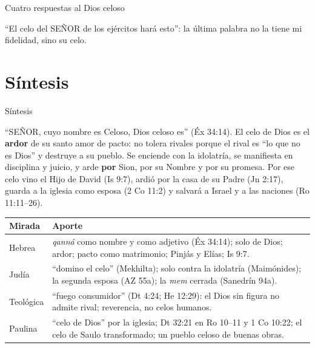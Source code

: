 \documentclass[hyperref={bookmarks=false},aspectratio=169]{beamer}
\newcommand{\SENOR}{S{\fontsize{0.78em}{1em}\selectfont EÑOR}}
\newcommand{\destacar}[1]{\textbf{\textcolor{azul}{#1}}}
\begin{document}
\begin{frame}{Cuatro respuestas al Dios celoso}
\centering
{}\par\medskip
\small\RaggedRight ``El celo del \SENOR{} de los ejércitos hará esto'': la última palabra no la tiene mi fidelidad, sino su celo.
\end{frame}

\section{Síntesis}

\begin{frame}{Síntesis}
\begin{tcolorbox}[colback=papiro,colframe=azul,boxrule=1pt,arc=3pt]
\small ``\SENOR, cuyo nombre es Celoso, Dios celoso es'' (Éx 34:14). El celo de Dios es el \destacar{ardor} de su santo amor de pacto: no tolera rivales porque el rival es ``lo que no es Dios'' y destruye a su pueblo. Se enciende con la idolatría, se manifiesta en disciplina y juicio, y arde \destacar{por} Sion, por su Nombre y por su promesa. Por ese celo vino el Hijo de David (Is 9:7), ardió por la casa de su Padre (Jn 2:17), guarda a la iglesia como esposa (2 Co 11:2) y salvará a Israel y a las naciones (Ro 11:11--26).
\end{tcolorbox}
\scriptsize\renewcommand{\arraystretch}{1.15}
\begin{tabular}{@{}>{\RaggedRight\arraybackslash}p{2.4cm}>{\RaggedRight\arraybackslash}p{9.4cm}@{}}
\toprule
\textbf{Mirada} & \textbf{Aporte} \\ \midrule
Hebrea & \emph{qanná} como nombre y como adjetivo (Éx 34:14); solo de Dios; ardor; pacto como matrimonio; Pinjás y Elías; Is 9:7. \\
Judía & ``domino el celo'' (Mekhilta); solo contra la idolatría (Maimónides); la segunda esposa (AZ 55a); la \emph{mem} cerrada (Sanedrín 94a). \\
Teológica & ``fuego consumidor'' (Dt 4:24; He 12:29): el Dios sin figura no admite rival; reverencia, no celos humanos. \\
Paulina & ``celo de Dios'' por la iglesia; Dt 32:21 en Ro 10--11 y 1 Co 10:22; el celo de Saulo transformado; un pueblo celoso de buenas obras. \\
\bottomrule
\end{tabular}
\end{frame}
\end{document}
